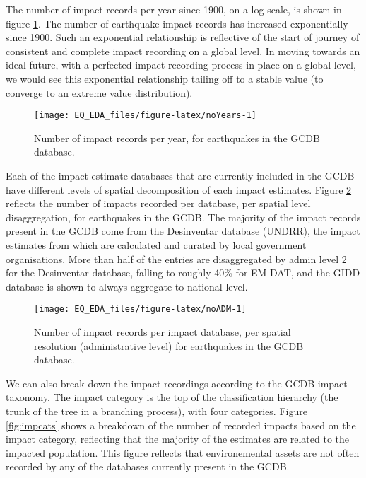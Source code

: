 \documentclass[
]{article}
\begin{document}
The number of impact records per year since 1900, on a log-scale, is shown in figure \ref{fig:noYears}. The number of earthquake impact records has increased exponentially since 1900. Such an exponential relationship is reflective of the start of journey of consistent and complete impact recording on a global level. In moving towards an ideal future, with a perfected impact recording process in place on a global level, we would see this exponential relationship tailing off to a stable value (to converge to an extreme value distribution).

\begin{figure}
\texttt{[image: EQ\_EDA\_files/figure-latex/noYears-1]} \caption[Number of impact records per year, for earthquakes in the GCDB database]{Number of impact records per year, for earthquakes in the GCDB database.}\label{fig:noYears}
\end{figure}

Each of the impact estimate databases that are currently included in the GCDB have different levels of spatial decomposition of each impact estimates. Figure \ref{fig:noADM} reflects the number of impacts recorded per database, per spatial level disaggregation, for earthquakes in the GCDB. The majority of the impact records present in the GCDB come from the Desinventar database (UNDRR), the impact estimates from which are calculated and curated by local government organisations. More than half of the entries are disaggregated by admin level 2 for the Desinventar database, falling to roughly 40\% for EM-DAT, and the GIDD database is shown to always aggregate to national level.

\begin{figure}
\texttt{[image: EQ\_EDA\_files/figure-latex/noADM-1]} \caption[Number of impact records per impact database, per spatial resolution (administrative level) for earthquakes in the GCDB database]{Number of impact records per impact database, per spatial resolution (administrative level) for earthquakes in the GCDB database.}\label{fig:noADM}
\end{figure}

We can also break down the impact recordings according to the GCDB impact taxonomy. The impact category is the top of the classification hierarchy (the trunk of the tree in a branching process), with four categories. Figure \ref{fig:impcats} shows a breakdown of the number of recorded impacts based on the impact category, reflecting that the majority of the estimates are related to the impacted population. This figure reflects that environemental assets are not often recorded by any of the databases currently present in the GCDB.
\end{document}
